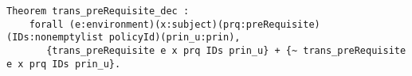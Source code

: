 \begin{lstlisting}
Theorem trans_preRequisite_dec :
    forall (e:environment)(x:subject)(prq:preRequisite)(IDs:nonemptylist policyId)(prin_u:prin),
       {trans_preRequisite e x prq IDs prin_u} + {~ trans_preRequisite e x prq IDs prin_u}.
\end{lstlisting}


%
%
%
%
%
%   
%
%
